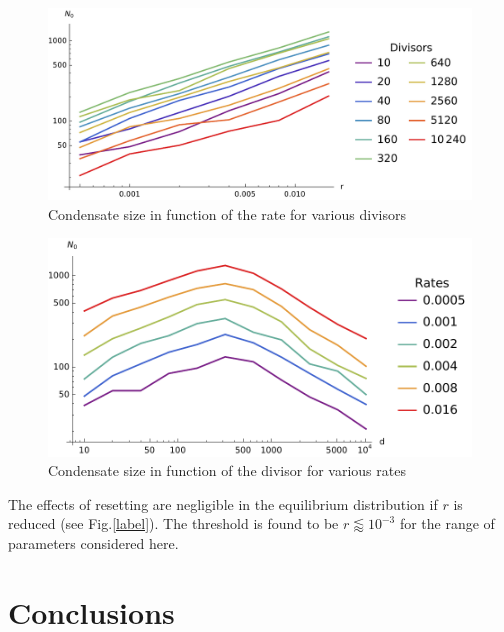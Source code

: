 \documentclass[a4paper,12pt,reqno,superscriptaddress,nofootinbib]{article}
\theoremstyle{plain}
\theoremstyle{definition}
\theoremstyle{remark}
\newcommand{\0}{^{(0)}}
\newcommand{\1}{^{(1)}}
\newcommand{\2}{^{(2)}}
\begin{document}
\begin{figure}
		\includegraphics[width=\textwidth]{near-divisors.pdf}
		\caption{Condensate size in function of the rate for various divisors}\label{fig:near-divisors}
\end{figure}
\begin{figure}
		\includegraphics[width=\textwidth]{near-rates.pdf}
		\caption{Condensate size in function of the divisor for various rates}\label{fig:near-rates}
\end{figure}

The effects of resetting are negligible in the equilibrium distribution if $r$ is reduced (see Fig.\ref{label}). The threshold is found to be $r\lessapprox 10^{-3}$ for the range of parameters considered here.

\section {Conclusions}\label{con}




\end{document}
